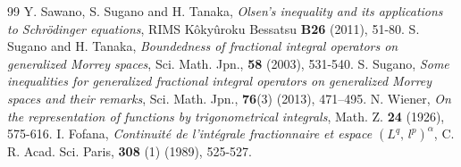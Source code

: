 \documentclass[10pt,a4paper]{amsart}
\numberwithin{equation}{section}
\numberwithin{equation}{section}
\begin{document}
\begin{thebibliography}{99}
 Y. Sawano, S. Sugano and H. Tanaka, \textit{Olsen's inequality and its applications to Schr\"odinger equations}, RIMS Kôkyûroku Bessatsu \textbf{B26} (2011), 51-80.
 S. Sugano and H. Tanaka, \textit{Boundedness of fractional integral operators on generalized Morrey spaces}, Sci. Math. Jpn., \textbf{58} (2003), 531-540.
 S. Sugano, \textit{Some inequalities for generalized fractional integral operators on generalized Morrey spaces and their remarks}, Sci. Math. Jpn., \textbf{76}(3) (2013), 471–495.
 N. Wiener, \textit{On the representation of functions by trigonometrical integrals}, Math. Z. \textbf{24} (1926), 575-616.
 I. Fofana, \textit{Continuit\'{e} de l'int\'{e}grale fractionnaire et espace $(L^{q},\, l^{ p})^{\alpha}$}, C. R. Acad. Sci. Paris, \textbf{308} (1) (1989), 525-527.
\end{thebibliography}
\end{document}
